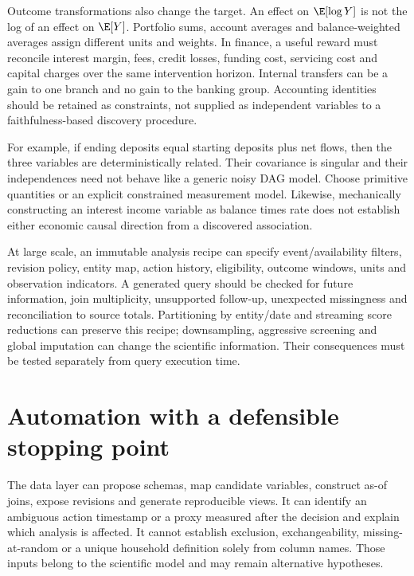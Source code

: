 Outcome transformations also change the target. An effect on
$\E[\log Y]$ is not the log of an effect on $\E[Y]$.
Portfolio sums, account averages and balance-weighted averages assign
different units and weights. In finance, a useful reward must reconcile
interest margin, fees, credit losses, funding cost, servicing cost and
capital charges over the same intervention horizon. Internal transfers
can be a gain to one branch and no gain to the banking group. Accounting
identities should be retained as constraints, not supplied as independent
variables to a faithfulness-based discovery procedure.

For example, if ending deposits equal starting deposits plus net flows,
then the three variables are deterministically related. Their covariance
is singular and their independences need not behave like a generic
noisy DAG model. Choose primitive quantities or an explicit constrained
measurement model. Likewise, mechanically constructing an interest
income variable as balance times rate does not establish either economic
causal direction from a discovered association.

At large scale, an immutable analysis recipe can specify event/availability
filters, revision policy, entity map, action history, eligibility, outcome
windows, units and observation indicators. A generated query should be
checked for future information, join multiplicity, unsupported follow-up,
unexpected missingness and reconciliation to source totals. Partitioning
by entity/date and streaming score reductions can preserve this recipe;
downsampling, aggressive screening and global imputation can change the
scientific information. Their consequences must be tested separately
from query execution time.



\section{Automation with a defensible stopping point}
The data layer can propose schemas, map candidate variables, construct
as-of joins, expose revisions and generate reproducible views. It can
identify an ambiguous action timestamp or a proxy measured after the
decision and explain which analysis is affected. It cannot establish
exclusion, exchangeability, missing-at-random or a unique household
definition solely from column names. Those inputs belong to the
scientific model and may remain alternative hypotheses.

